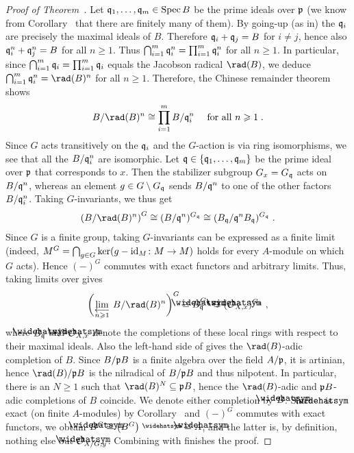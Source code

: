 \documentclass[a4paper,parskip=half,numbers=enddot, DIV=12]{scrreprt}
\renewcommand{\geq}{\geqslant}
\begin{document}
\begin{proof}[Proof of Theorem~]
	Let $\mathfrak{q}_1,\ldots,\mathfrak{q}_m\in\operatorname{Spec} B$ be the prime ideals over $\mathfrak{p}$ (we know from Corollary~ that there are finitely many of them). By going-up (as in\cite[Theorem~7]{alg1}) the $\mathfrak{q}_i$ are precisely the maximal ideals of $B$. Therefore $\mathfrak{q}_i+\mathfrak{q}_j=B$ for $i\neq j$, hence also $\mathfrak{q}_i^n+\mathfrak{q}_j^n=B$ for all $n\geq 1$. Thus $\bigcap_{i=1}^m\mathfrak{q}_i^n=\prod_{i=1}^m\mathfrak{q}_i^n$ for all $n\geq 1$. In particular, since $\bigcap_{i=1}^m\mathfrak{q}_i=\prod_{i=1}^m\mathfrak{q}_i$ equals the Jacobson radical $\rad (B)$, we deduce $\bigcap_{i=1}^m\qq_i^n=\rad (B)^n$ for all $n\geq 1$. Therefore, the Chinese remainder theorem shows
	\begin{align}\lbl{eq:ChineseRemainderTheorem}
		B/\rad (B)^n\cong \prod_{i=1}^mB/\qq_i^n\quad\text{ for all }n\geq 1\;.
	\end{align}
	Since $G$ acts transitively on the $\mathfrak{q}_i$ and the $G$-action is via ring isomorphisms, we see that all the $B/\mathfrak{q}_i^n$ are isomorphic. Let $\mathfrak{q}\in\{\mathfrak{q}_1,\ldots,\mathfrak{q}_m\}$ be the prime ideal over $\mathfrak{p}$ that corresponds to $x$. Then the stabilizer subgroup $G_x=G_{\mathfrak{q}}$ acts on $B/\mathfrak{q}^n$, whereas an element $g\in G\setminus G_{\mathfrak{q}}$ sends $B/\mathfrak{q}^n$ to one of the other factors $B/\mathfrak{q}_i^n$. Taking $G$-invariants, we thus get
	\begin{align}\lbl{eq:BradBG}
		\left(B/\rad(B)^n\right)^G\cong (B/\qq^n)^{G_\qq}\cong (B_\qq/\qq^nB_\qq)^{G_\qq}\;.
	\end{align}
	Since $G$ is a finite group, taking $G$-invariants can be expressed as a finite limit (indeed, $M^G=\bigcap_{g\in G}\ker(g-\id_M\colon M\morphism M)$ holds for every $A$-module on which $G$ acts). Hence $(-)^G$ commutes with exact functors and arbitrary limits. Thus, taking limits over  gives
	\begin{align}\lbl{eq:OXxG}
		\bigg(\limit[n\geq 1]B/\rad(B)^n\bigg)^G\cong \roof{B}_\qq^{G_\qq}\cong (\roof{\Oo}_{X,x})^{G_x}\;,
	\end{align}
	where $\roof{B}_\qq$ and $\roof{\Oo}_{X,x}$ denote the completions of these local rings with respect to their maximal ideals. Also the left-hand side of  gives the $\rad(B)$-adic completion of $B$. Since $B/\mathfrak{p} B$ is a finite algebra over the field $A/\mathfrak{p}$, it is artinian, hence $\rad(B)/\pp B$ is the nilradical of $B/\mathfrak{p} B$ and thus nilpotent. In particular, there is an $N\geq 1$ such that $\rad(B)^N\subseteq \pp B$, hence the $\rad(B)$-adic and $\mathfrak{p} B$-adic completions of $B$ coincide. We denote either completion by $\roof{B}$. Since $\roof{\phantom{x}}$ is exact (on finite $A$-modules) by Corollary~ and $(-)^G$ commutes with exact functors, we obtain $\roof{B}^G\cong \big(B^G\big)^\complete\cong\roof{A}$, and the latter is, by definition, nothing else but $\roof{\Oo}_{X/G,y}$. Combining with  finishes the proof.
\end{proof}
\end{document}
